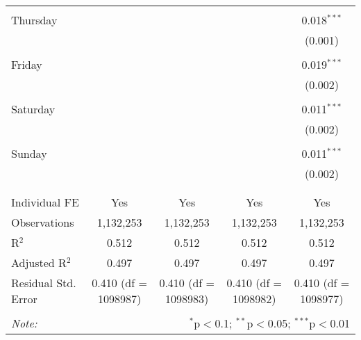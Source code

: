 \documentclass[
]{article}
\begin{document}
\begin{table}[!htbp]
{\begin{tabular}{@{\extracolsep{5pt}}lcccc}
  & & & & \\ 
 Thursday &  &  &  & 0.018$^{***}$ \\ 
  &  &  &  & (0.001) \\ 
  & & & & \\ 
 Friday &  &  &  & 0.019$^{***}$ \\ 
  &  &  &  & (0.002) \\ 
  & & & & \\ 
 Saturday &  &  &  & 0.011$^{***}$ \\ 
  &  &  &  & (0.002) \\ 
  & & & & \\ 
 Sunday &  &  &  & 0.011$^{***}$ \\ 
  &  &  &  & (0.002) \\ 
  & & & & \\ 
\hline \\[-1.8ex] 
Individual FE & Yes & Yes & Yes & Yes \\ 
Observations & 1,132,253 & 1,132,253 & 1,132,253 & 1,132,253 \\ 
R$^{2}$ & 0.512 & 0.512 & 0.512 & 0.512 \\ 
Adjusted R$^{2}$ & 0.497 & 0.497 & 0.497 & 0.497 \\ 
Residual Std. Error & 0.410 (df = 1098987) & 0.410 (df = 1098983) & 0.410 (df = 1098982) & 0.410 (df = 1098977) \\ 
\hline 
\hline \\[-1.8ex] 
\textit{Note:}  & \multicolumn{4}{r}{$^{*}$p$<$0.1; $^{**}$p$<$0.05; $^{***}$p$<$0.01} \\ 
\end{tabular}
} 
\end{table} 
\newpage
\end{document}
